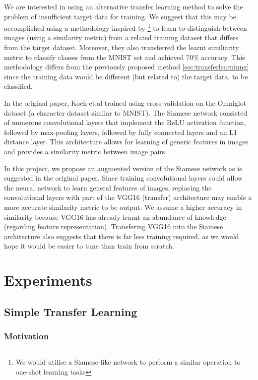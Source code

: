 \documentclass{article}
\begin{document}
We are interested in using an alternative transfer learning method to solve the problem of insufficient target data for training. We suggest that this may be accomplished using a methodology inspired by \cite{koch}\footnote{We would utilise a Siamese-like network to perform a similar operation to one-shot learning tasks} to learn to distinguish between images (using a similarity metric) from a related training dataset that differs from the target dataset. Moreover, they also transferred the learnt similiarity metric to classify classes from the MNIST set and achieved $70\%$ accuracy. This methodology differs from the previously proposed method \ref{sec:transferlearninng} since the training data would be different (but related to) the target data, to be classified.

In the original paper, Koch et.al trained using cross-validation on the Omniglot dataset (a character dataset similar to MNIST). The Siamese network consisted of numerous convolutional layers that implement the ReLU activation function, followed by max-pooling layers, followed by fully connected layers and an L1 distance layer. This architecture allows for learning of generic features in images and provides a similarity metric between image pairs.

In this project, we propose an augmented version of the Siamese network as is suggested in the original paper. Since training convolutional layers could allow the neural network to learn general features of images, replacing the convolutional layers with part of the VGG16 (transfer) architecture may enable a more accurate similarity metric to be output. We assume a higher accuracy in similarity because VGG16 has already learnt an abundance of knowledge (regarding feature representation). Transfering VGG16 into the Siamese architecture also suggests that there is far less training required, as we would hope it would be easier to tune than train from scratch.

\section{Experiments}
\label{sec:experiments}

\subsection{Simple Transfer Learning}

\subsubsection{\textbf{Motivation}}
\end{document}
